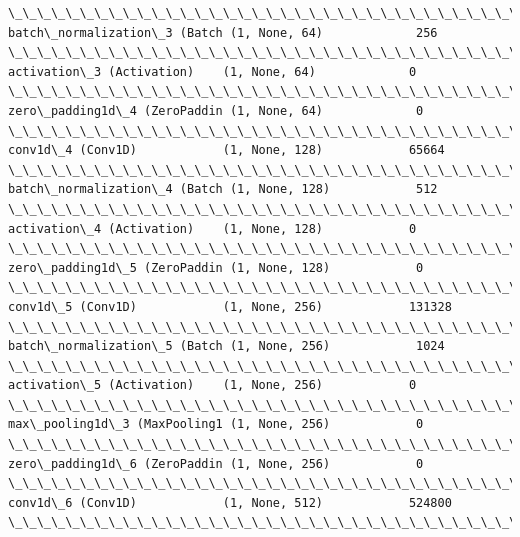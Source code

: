 \documentclass[11pt]{article}
\begin{document}
\begin{Verbatim}[commandchars=\\\{\}]
\_\_\_\_\_\_\_\_\_\_\_\_\_\_\_\_\_\_\_\_\_\_\_\_\_\_\_\_\_\_\_\_\_\_\_\_\_\_\_\_\_\_\_\_\_\_\_\_\_\_\_\_\_\_\_\_\_\_\_\_\_\_\_\_\_
batch\_normalization\_3 (Batch (1, None, 64)             256       
\_\_\_\_\_\_\_\_\_\_\_\_\_\_\_\_\_\_\_\_\_\_\_\_\_\_\_\_\_\_\_\_\_\_\_\_\_\_\_\_\_\_\_\_\_\_\_\_\_\_\_\_\_\_\_\_\_\_\_\_\_\_\_\_\_
activation\_3 (Activation)    (1, None, 64)             0         
\_\_\_\_\_\_\_\_\_\_\_\_\_\_\_\_\_\_\_\_\_\_\_\_\_\_\_\_\_\_\_\_\_\_\_\_\_\_\_\_\_\_\_\_\_\_\_\_\_\_\_\_\_\_\_\_\_\_\_\_\_\_\_\_\_
zero\_padding1d\_4 (ZeroPaddin (1, None, 64)             0         
\_\_\_\_\_\_\_\_\_\_\_\_\_\_\_\_\_\_\_\_\_\_\_\_\_\_\_\_\_\_\_\_\_\_\_\_\_\_\_\_\_\_\_\_\_\_\_\_\_\_\_\_\_\_\_\_\_\_\_\_\_\_\_\_\_
conv1d\_4 (Conv1D)            (1, None, 128)            65664     
\_\_\_\_\_\_\_\_\_\_\_\_\_\_\_\_\_\_\_\_\_\_\_\_\_\_\_\_\_\_\_\_\_\_\_\_\_\_\_\_\_\_\_\_\_\_\_\_\_\_\_\_\_\_\_\_\_\_\_\_\_\_\_\_\_
batch\_normalization\_4 (Batch (1, None, 128)            512       
\_\_\_\_\_\_\_\_\_\_\_\_\_\_\_\_\_\_\_\_\_\_\_\_\_\_\_\_\_\_\_\_\_\_\_\_\_\_\_\_\_\_\_\_\_\_\_\_\_\_\_\_\_\_\_\_\_\_\_\_\_\_\_\_\_
activation\_4 (Activation)    (1, None, 128)            0         
\_\_\_\_\_\_\_\_\_\_\_\_\_\_\_\_\_\_\_\_\_\_\_\_\_\_\_\_\_\_\_\_\_\_\_\_\_\_\_\_\_\_\_\_\_\_\_\_\_\_\_\_\_\_\_\_\_\_\_\_\_\_\_\_\_
zero\_padding1d\_5 (ZeroPaddin (1, None, 128)            0         
\_\_\_\_\_\_\_\_\_\_\_\_\_\_\_\_\_\_\_\_\_\_\_\_\_\_\_\_\_\_\_\_\_\_\_\_\_\_\_\_\_\_\_\_\_\_\_\_\_\_\_\_\_\_\_\_\_\_\_\_\_\_\_\_\_
conv1d\_5 (Conv1D)            (1, None, 256)            131328    
\_\_\_\_\_\_\_\_\_\_\_\_\_\_\_\_\_\_\_\_\_\_\_\_\_\_\_\_\_\_\_\_\_\_\_\_\_\_\_\_\_\_\_\_\_\_\_\_\_\_\_\_\_\_\_\_\_\_\_\_\_\_\_\_\_
batch\_normalization\_5 (Batch (1, None, 256)            1024      
\_\_\_\_\_\_\_\_\_\_\_\_\_\_\_\_\_\_\_\_\_\_\_\_\_\_\_\_\_\_\_\_\_\_\_\_\_\_\_\_\_\_\_\_\_\_\_\_\_\_\_\_\_\_\_\_\_\_\_\_\_\_\_\_\_
activation\_5 (Activation)    (1, None, 256)            0         
\_\_\_\_\_\_\_\_\_\_\_\_\_\_\_\_\_\_\_\_\_\_\_\_\_\_\_\_\_\_\_\_\_\_\_\_\_\_\_\_\_\_\_\_\_\_\_\_\_\_\_\_\_\_\_\_\_\_\_\_\_\_\_\_\_
max\_pooling1d\_3 (MaxPooling1 (1, None, 256)            0         
\_\_\_\_\_\_\_\_\_\_\_\_\_\_\_\_\_\_\_\_\_\_\_\_\_\_\_\_\_\_\_\_\_\_\_\_\_\_\_\_\_\_\_\_\_\_\_\_\_\_\_\_\_\_\_\_\_\_\_\_\_\_\_\_\_
zero\_padding1d\_6 (ZeroPaddin (1, None, 256)            0         
\_\_\_\_\_\_\_\_\_\_\_\_\_\_\_\_\_\_\_\_\_\_\_\_\_\_\_\_\_\_\_\_\_\_\_\_\_\_\_\_\_\_\_\_\_\_\_\_\_\_\_\_\_\_\_\_\_\_\_\_\_\_\_\_\_
conv1d\_6 (Conv1D)            (1, None, 512)            524800    
\_\_\_\_\_\_\_\_\_\_\_\_\_\_\_\_\_\_\_\_\_\_\_\_\_\_\_\_\_\_\_\_\_\_\_\_\_\_\_\_\_\_\_\_\_\_\_\_\_\_\_\_\_\_\_\_\_\_\_\_\_\_\_\_\_

\end{Verbatim}
\end{document}
